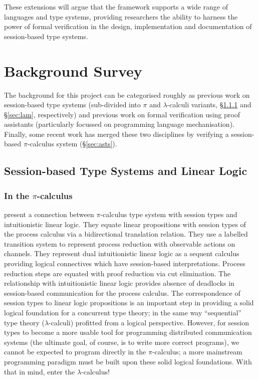 \documentclass{mprop}
\begin{document}
These extensions will argue that the framework supports a wide range of languages and type systems, providing researchers the ability to harness the power of formal verification in the design, implementation and documentation of session-based type systems.

\section{Background Survey}


The background for this project can be categorised roughly as previous work on session-based type systems (sub-divided into $\pi$ and $\lambda$-calculi variants, \S \ref{sec:pis} and \S \ref{sec:lam}, respectively) and previous work on formal verification using proof assistants (particularly focussed on programming language mechanisation). Finally, some recent work has merged these two disciplines by verifying a session-based $\pi$-calculus system (\S \ref{sec:asts}).

\subsection{Session-based Type Systems and Linear Logic}\label{sec:sts}

\subsubsection{In the $\pi$-calculus}\label{sec:pis}

\citeauthor{Caires:2010:STI} \cite{Caires:2010:STI} present a connection between $\pi$-calculus type system with session types and intuitionistic linear logic. They equate linear propositions with session types of the process calculus via a bidirectional translation relation. They use a labelled transition system to represent process reduction with observable actions on channels. They represent dual intuitionistic linear logic as a sequent calculus providing logical connectives which have session-based interpretations. Process reduction steps are equated with proof reduction via cut elimination. The relationship with intuitionistic linear logic provides absence of deadlocks in session-based communication for the process calculus. The correspondence of session types to linear logic propositions is an important step in providing a solid logical foundation for a concurrent type theory; in the same way ``sequential'' type theory ($\lambda$-calculi) profitted from a logical perspective. However, for session types to become a more usable tool for programming distributed communication systems (the ultimate goal, of course, is to write more correct programs), we cannot be expected to program directly in the $\pi$-calculus; a more mainstream programming paradigm must be built upon these solid logical foundations. With that in mind, enter the $\lambda$-calculus!
\end{document}
